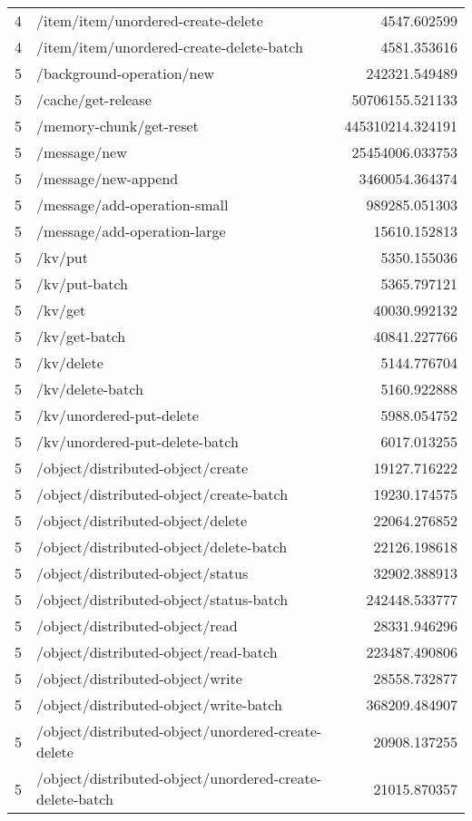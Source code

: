 \begin{longtable}{rlr}
4 & /item/item/unordered-create-delete & 4547.602599 \\
4 & /item/item/unordered-create-delete-batch & 4581.353616 \\
5 & /background-operation/new & 242321.549489 \\
5 & /cache/get-release & 50706155.521133 \\
5 & /memory-chunk/get-reset & 445310214.324191 \\
5 & /message/new & 25454006.033753 \\
5 & /message/new-append & 3460054.364374 \\
5 & /message/add-operation-small & 989285.051303 \\
5 & /message/add-operation-large & 15610.152813 \\
5 & /kv/put & 5350.155036 \\
5 & /kv/put-batch & 5365.797121 \\
5 & /kv/get & 40030.992132 \\
5 & /kv/get-batch & 40841.227766 \\
5 & /kv/delete & 5144.776704 \\
5 & /kv/delete-batch & 5160.922888 \\
5 & /kv/unordered-put-delete & 5988.054752 \\
5 & /kv/unordered-put-delete-batch & 6017.013255 \\
5 & /object/distributed-object/create & 19127.716222 \\
5 & /object/distributed-object/create-batch & 19230.174575 \\
5 & /object/distributed-object/delete & 22064.276852 \\
5 & /object/distributed-object/delete-batch & 22126.198618 \\
5 & /object/distributed-object/status & 32902.388913 \\
5 & /object/distributed-object/status-batch & 242448.533777 \\
5 & /object/distributed-object/read & 28331.946296 \\
5 & /object/distributed-object/read-batch & 223487.490806 \\
5 & /object/distributed-object/write & 28558.732877 \\
5 & /object/distributed-object/write-batch & 368209.484907 \\
5 & /object/distributed-object/unordered-create-delete & 20908.137255 \\
5 & /object/distributed-object/unordered-create-delete-batch & 21015.870357 \\

\end{longtable}
